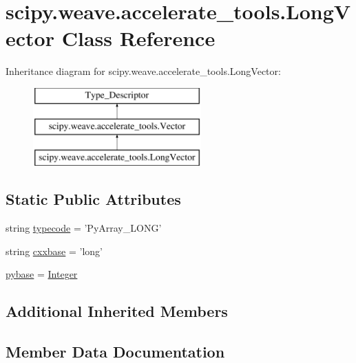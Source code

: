 \hypertarget{classscipy_1_1weave_1_1accelerate__tools_1_1LongVector}{}\section{scipy.\+weave.\+accelerate\+\_\+tools.\+Long\+Vector Class Reference}
\label{classscipy_1_1weave_1_1accelerate__tools_1_1LongVector}
Inheritance diagram for scipy.\+weave.\+accelerate\+\_\+tools.\+Long\+Vector\+:\begin{figure}[H]
\begin{center}
\leavevmode
\includegraphics[height=3.000000cm]{classscipy_1_1weave_1_1accelerate__tools_1_1LongVector}
\end{center}
\end{figure}
\subsection*{Static Public Attributes}
\begin{DoxyCompactItemize}
\item 
string \hyperlink{classscipy_1_1weave_1_1accelerate__tools_1_1LongVector_a0508940a8b4ef26b057c7ea077175c50}{typecode} = 'Py\+Array\+\_\+\+L\+O\+N\+G'
\item 
string \hyperlink{classscipy_1_1weave_1_1accelerate__tools_1_1LongVector_a740fe9568c1789eb15b361f9984df633}{cxxbase} = 'long'
\item 
\hyperlink{classscipy_1_1weave_1_1accelerate__tools_1_1LongVector_acdb03a5de2eb9c1ad88e05330e37d3c8}{pybase} = \hyperlink{classscipy_1_1weave_1_1accelerate__tools_1_1Integer}{Integer}
\end{DoxyCompactItemize}
\subsection*{Additional Inherited Members}


\subsection{Member Data Documentation}
\hypertarget{classscipy_1_1weave_1_1accelerate__tools_1_1LongVector_a740fe9568c1789eb15b361f9984df633}{}
